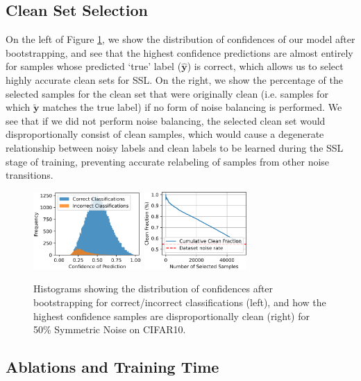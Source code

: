 \documentclass[10pt,twocolumn,letterpaper]{article}
\begin{document}
\subsection{Clean Set Selection}

On the left of Figure \ref{fig:cleanandcorrectbias}, we show the distribution of confidences of our model after bootstrapping, and see that the highest confidence predictions are almost entirely for samples whose predicted `true' label ($\hat{\mathbf{y}}$) is correct, which allows us to select highly accurate clean sets for SSL. On the right, we show the percentage of the selected samples for the clean set that were originally clean (i.e. samples for which $\tilde{\mathbf{y}}$ matches the true label) if no form of noise balancing is performed. We see that if we did not perform noise balancing, the selected clean set would disproportionally consist of clean samples, which would cause a degenerate relationship between noisy labels and clean labels to be learned during the SSL stage of training, preventing accurate relabeling of samples from other noise transitions. 

\begin{figure}[ht!]
    \begin{center}
    \includegraphics[width=4.1cm]{Figures/confidences.png}\hfill
    \includegraphics[width=3.9cm]{Figures/clean_frac_against_num_selected_confidence.png}
    \end{center}
    \caption{Histograms showing the distribution of confidences after bootstrapping for correct/incorrect classifications (left), and how the highest confidence samples are disproportionally clean (right) for 50\% Symmetric Noise on CIFAR10.}
    \label{fig:cleanandcorrectbias}
\end{figure}

\subsection{Ablations and Training Time}
\end{document}
